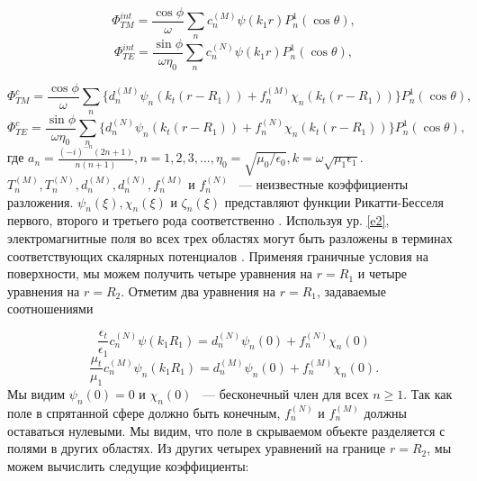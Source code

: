 \documentclass[a4paper, 12pt]{article}
\begin{document}
\vspace{1cm}

\begin{equation*}
	\Phi_{TM}^{int} = \frac{\cos\phi}{\omega}\sum_n{c_n^{(M)}\psi(k_1r)P_n^1(\cos\theta)},
\end{equation*}
\begin{equation}\label{e8}
	\Phi_{TE}^{int} = \frac{\sin\phi}{\omega\eta_0}\sum_n{c_n^{(N)}\psi(k_1r)P_n^1(\cos\theta)},
\end{equation}

\vspace{1cm}

\begin{equation*}
	\Phi_{TM}^c = \frac{\cos\phi}{\omega}\sum_n{\{d_n^{(M)}\psi_n(k_t(r-R_1)) +
	f_n^{(M)}\chi_n(k_t(r-R_1))\}P_n^1(\cos\theta)},
\end{equation*}
\begin{equation}\label{e9}
	\Phi_{TE}^c = \frac{\sin\phi}{\omega\eta_0}\sum_n{\{d_n^{(N)}\psi_n(k_t(r-R_1)) +
	f_n^{(N)}\chi_n(k_t(r-R_1))\}P_n^1(\cos\theta)},
\end{equation}
где $a_n=\frac{(-i)^{-n}(2n+1)}{n(n+1)}, n=1,2,3,..., 
\eta_0=\sqrt{\mu_0/\epsilon_0},k=\omega\sqrt{\mu_1\epsilon_1}$. 
$T_n^{(M)}, T_n^{(N)}, d_n^{(M)}, d_n^{(N)}, f_n^{(M)}$ и $f_n^{(N)}$ ~--- 
неизвестные коэффициенты разложения. 
$\psi_n(\xi), \chi_n(\xi)$ и $\zeta_n(\xi)$ представляют функции Рикатти-Бесселя
первого, второго и третьего рода соответственно \cite{15}. 
Используя ур. \eqref{e2}, электромагнитные поля во всех трех областях могут быть
разложены в терминах соответствующих скалярных потенциалов \cite{16}. 
Применяя граничные условия на поверхности, мы можем получить четыре уравнения
на $r=R_1$ и четыре уравнения на $r=R_2$. Отметим два уравнения на $r=R_1$, 
задаваемые соотношениями

\begin{equation}\label{e10}
	\frac{\epsilon_t}{\epsilon_1}c_n^{(N)}\psi(k_1R_1) = d_n^{(N)}\psi_n(0) +
	f_n^{(N)}\chi_n(0)
\end{equation}
\begin{equation}\label{e11}
\frac{\mu_t}{\mu_1}c_n^{(M)}\psi_n(k_1R_1)=d_n^{(M)}\psi_n(0)+f_n^{(M)}\chi_n(0).
\end{equation}
Мы видим $\psi_n(0)=0$ и $\chi_n(0)$ ~--- бесконечный член для всех $n\ge1$.
Так как поле в спрятанной сфере должно быть конечным, $f_n^{(N)}$ и $f_n^{(M)}$
должны оставаться нулевыми. Мы видим, что поле в скрываемом объекте разделяется
с полями в других областях. Из других четырех уравнений на границе $r=R_2$,
мы можем вычислить следущие коэффициенты:
\end{document}
